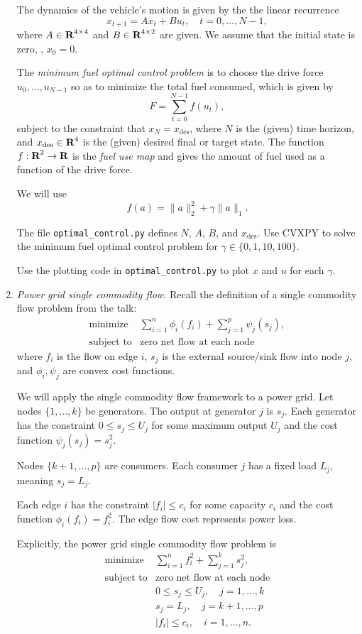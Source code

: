 \documentclass[12pt]{article}
\begin{document}
\begin{enumerate}
The dynamics of the vehicle's motion is given by the the linear recurrence
\[
x_{t+1} = Ax_t + Bu_t, \quad t=0, \ldots, N-1,
\]
where $A \in {\mbox{\bf R}}^{4 \times 4}$ and $B \in {\mbox{\bf R}}^{4 \times 2}$ are given. We assume that the initial state is zero, \ie, $x_0 = 0$.

The \emph{minimum fuel optimal control problem}
is to choose the drive force $u_0, \ldots, u_{N-1}$ so as to
minimize the total fuel consumed, which is given by
\[
F = \sum_{t=0}^{N-1} f(u_t),
\]
subject to the constraint that $x_N = x_\mathrm{des}$,
where $N$ is the (given) time horizon, and $x_\mathrm{des} \in {\mbox{\bf R}}^4$
is the (given) desired final or target state.
The function $f:{\mbox{\bf R}}^2 \rightarrow {\mbox{\bf R}}$ is the \emph{fuel use map} and gives the amount of fuel used as a function of the drive force.

We will use
\[
f(a) = \|a\|^2_2 + \gamma\|a\|_1.
\]

The file \verb+optimal_control.py+ defines $N$, $A$, $B$, and $x_\mathrm{des}$. Use CVXPY to solve the minimum fuel optimal control problem for $\gamma \in \{0,1,10,100\}$.

Use the plotting code in \verb+optimal_control.py+ to plot $x$ and $u$ for each $\gamma$.

\item\emph{Power grid single commodity flow.}
Recall the definition of a single commodity flow problem from the talk:
\[
\begin{array}{ll} \mbox{minimize} & \sum_{i=1}^n\phi_{i}(f_{i}) + \sum_{j=1}^p\psi_j(s_j), \\
\mbox{subject to} & \text{zero net flow at each node}
\end{array}
\]
where $f_i$ is the flow on edge $i$, $s_j$ is the external source/sink flow into node $j$, and $\phi_i,\psi_j$ are convex cost functions.

We will apply the single commodity flow framework to a power grid. Let nodes $\{1,\ldots,k\}$ be generators. The output at generator $j$ is $s_j$. Each generator has the constraint $0 \leq s_j \leq U_j$ for some maximum output $U_j$ and the cost function $\psi_j(s_j) = s_j^2$.

Nodes $\{k+1,\ldots,p\}$ are consumers. Each consumer $j$ has a fixed load $L_j$, meaning $s_j = L_j$.

Each edge $i$ has the constraint $|f_i| \leq c_i$ for some capacity $c_i$ and the cost function $\phi_i(f_i) = f_i^2$. The edge flow cost represents power loss.

Explicitly, the power grid single commodity flow problem is
\[
\begin{array}{ll} \mbox{minimize} & \sum_{i=1}^nf_{i}^2 + \sum_{j=1}^k s_j^2, \\
\mbox{subject to} & \text{zero net flow at each node} \\
& 0 \leq s_j \leq U_j, \quad j = 1, \ldots, k \\
& s_j = L_j, \quad j = k+1, \ldots, p \\
& |f_i| \leq c_i, \quad i = 1, \ldots, n.
\end{array}
\]


\end{enumerate}
\end{document}
